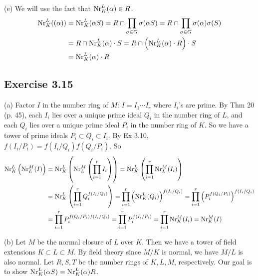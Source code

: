 \documentclass[../Marcus.tex]{subfiles}
\begin{document}
(e) We will use the fact that $\operatorname{Nr}^L_K(\alpha)\in R$.
\begin{align*}
\operatorname{Nr}^L_K((\alpha)) &= \operatorname{Nr}^L_K(\alpha S) = R\cap \prod_{\sigma\in G}\sigma(\alpha S) = R\cap \prod_{\sigma\in G}\sigma(\alpha)\sigma(S) \\
&= R\cap \operatorname{Nr}^L_K(\alpha)\cdot S = R\cap\left(\operatorname{Nr}^L_K(\alpha)\cdot R\right)\cdot S \\
&= \operatorname{Nr}^L_K(\alpha)\cdot R
\end{align*}

\subsection*{Exercise 3.15}

(a) Factor $I$ in the number ring of $M$: $I=I_1\cdots I_r$ where $I_i$'s are prime. By Thm 20 (p. 45), each $I_i$ lies over a unique prime ideal $Q_i$ in the number ring of $L$, and each $Q_i$ lies over a unique prime ideal $P_i$ in the number ring of $K$. So we have a tower of prime ideals $P_i\subset Q_i\subset I_i$. By Ex 3.10, $f(I_i/P_i)=f(I_i/Q_i)f(Q_i/P_i)$. So
\begin{align*}
\operatorname{Nr}^L_K\left(\operatorname{Nr}^M_L(I)\right) &= \operatorname{Nr}^L_K\left(\operatorname{Nr}^M_L\left(\prod_{i=1}^r I_i\right)\right) = \operatorname{Nr}^L_K\left(\prod_{i=1}^r \operatorname{Nr}^M_L(I_i)\right) \\ 
&= \operatorname{Nr}^L_K\left(\prod_{i=1}^r Q_i^{f(I_i/Q_i)}\right) = \prod_{i=1}^r \left(\operatorname{Nr}^L_K(Q_i)\right)^{f(I_i/Q_i)} = \prod_{i=1}^r \left(P_i^{f(Q_i/P_i)}\right)^{f(I_i/Q_i)} \\
&= \prod_{i=1}^r P_i^{f(Q_i/P_i)f(I_i/Q_i)} = \prod_{i=1}^r P_i^{f(I_i/P_i)} = \prod_{i=1}^r \operatorname{Nr}^M_K(I_i) = \operatorname{Nr}^M_K(I)
\end{align*}

(b) Let $M$ be the normal closure of $L$ over $K$. Then we have a tower of field extensions $K\subset L\subset M$. By field theory since $M/K$ is normal, we have $M/L$ is also normal. Let $R,S,T$ be the number rings of $K,L,M$, respectively. Our goal is to show $\operatorname{Nr}^L_K(\alpha S)=\operatorname{Nr}^L_K(\alpha)R$.
\end{document}

